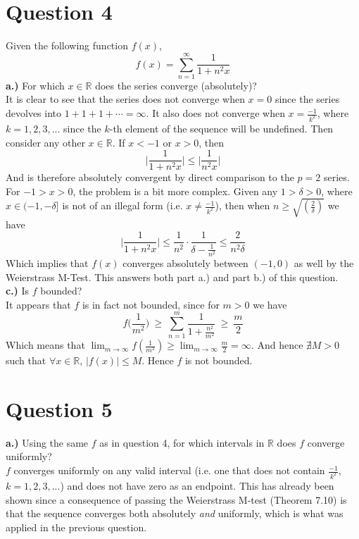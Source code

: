 \documentclass[12pt, letterpaper]{article}
\begin{document}
\section*{Question 4}
Given the following function $f(x)$,
$$ f(x) = \sum_{n=1}^\infty \frac{1}{1 + n^2x} $$
\noindent\textbf{a.)} For which $x \in \mathbb{R}$ does the series converge (absolutely)?\\

\noindent It is clear to see that the series does not converge when $x = 0$ since the series devolves into $1 + 1 + 1 + \cdots = \infty$. It also does not converge when $x = \frac{-1}{k^2}$, where $k = 1, 2, 3, ...$ since the $k$-th element of the sequence will be undefined. Then consider any other $x \in \mathbb{R}$. If $x < -1$ or $x > 0$, then
$$ \Big|\frac{1}{1+n^2x}\Big| \leq \Big|\frac{1}{n^2x}\Big| $$
And is therefore absolutely convergent by direct comparison to the $p=2$ series. For $-1 > x > 0$, the problem is a bit more complex. Given any $1 > \delta > 0$, where $x \in (-1, -\delta]$ is not of an illegal form (i.e. $x \neq \frac{-1}{k^2}$), then when $n \geq \sqrt{(\frac{2}{\delta})}$ we have
$$ \Big|\frac{1}{1+n^2x}\Big| \leq \frac{1}{n^2} \cdot \frac{1}{\delta - \frac{1}{n^2}} \leq \frac{2}{n^2\delta}$$
Which implies that $f(x)$ converges absolutely between $(-1, 0)$ as well by the Weierstrass M-Test. This answers both part a.) and part b.) of this question.\\

\noindent\textbf{c.)} Is $f$ bounded?\\

\noindent It appears that $f$ is in fact not bounded, since for $m > 0$ we have
$$ f\Big(\frac{1}{m^2}\Big) \ \geq \  \sum_{n=1}^m \frac{1}{1+\frac{n^2}{m^2}} \ \geq \ \frac{m}{2} $$
Which means that $\lim_{m\to\infty} f(\frac{1}{m^2}) \geq \lim_{m\to\infty} \frac{m}{2} = \infty$. And hence $\nexists M > 0$ such that $\forall x \in \mathbb{R}$, $|f(x)| \leq M$. Hence $f$ is not bounded.

\section*{Question 5}

\noindent\textbf{a.)} Using the same $f$ as in question 4, for which intervals in $\mathbb{R}$ does $f$ converge uniformly?\\

\noindent $f$ converges uniformly on any valid interval (i.e. one that does not contain $\frac{-1}{k^2}$, $k = 1, 2, 3, ...$) and does not have zero as an endpoint. This has already been shown since a consequence of passing the Weierstrass M-test (Theorem 7.10) is that the sequence converges both absolutely \textit{and} uniformly, which is what was applied in the previous question.\\
\end{document}
